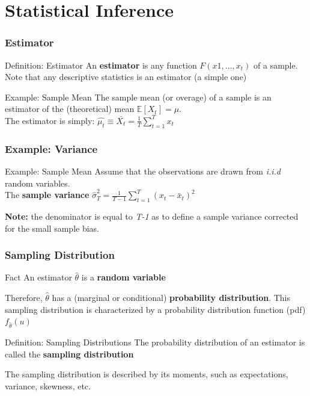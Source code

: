 \documentclass{beamer}
\begin{document}
\section{Statistical Inference}
\begin{frame}
  \frametitle{Estimator}

  \begin{block}{Definition: Estimator}
    An \textbf{estimator} is any function $F(x1, \dots, x_t)$ of a sample. Note that any descriptive statistics is an estimator (a simple one) 
  \end{block}


  \begin{exampleblock}{Example: Sample Mean}
    The sample mean (or overage) of a sample is an estimator of the (theoretical) mean $ \mathbb{E}[X_t] = \mu$.\\
    The estimator is simply: $\hat{\mu_t} \equiv \bar{X_t} = \frac{1}{T} \sum_{t=1}^{T}x_t$
  \end{exampleblock}
  
\end{frame}


\begin{frame}
  \frametitle{Example: Variance}

  \begin{exampleblock}{Example: Sample Mean}
    Assume that the observations are drawn from \emph{i.i.d} random variables.\\
    The \textbf{sample variance} $\hat{\sigma}^2_T = \frac{1}{T-1} \sum_{t=1}^T (x_t - \bar{x}_t)^2$
  \end{exampleblock}

\textbf{Note:} the denominator is equal to \emph{T-1} as to define a sample variance corrected for the small sample bias. 
  
\end{frame}



\begin{frame}
  \frametitle{Sampling Distribution}

  \begin{block}{Fact}
    An estimator $\hat{\theta}$ is a \textbf{random variable}
  \end{block}
  Therefore, $\hat{\theta}$ has a (marginal or conditional) \textbf{probability distribution}. This sampling distribution is characterized by a probability distribution function (pdf) $f_{\hat{\theta}}(u)$

  \begin{block}{Definition: Sampling Distributions}
    The probability distribution of an estimator is called the \textbf{sampling distribution}
  \end{block}
  The sampling distribution is described by its moments, such as expectations, variance, skewness, etc.
  \end{frame}
\end{document}
